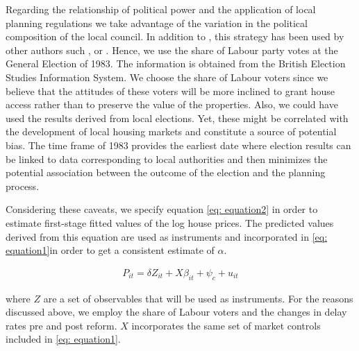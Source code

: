 \documentclass[12pt,letterpaper]{article}
\begin{document}
Regarding the relationship of political power and the application of local planning regulations we take
 advantage of the variation in the political composition of the local council. In addition to 
 \citet{hilber2016supply},
  this strategy has been used by other authors such \cite{bertrand2002does}, \cite{sadun2015} or \cite{cheshire2016}.
  Hence, we use the share of Labour party votes at the General Election of 1983.
   The information is obtained from the British Election Studies Information System.  
   We choose the share of Labour voters since we believe that the attitudes of these voters 
   will be more inclined to grant house access rather than to preserve the value of the properties.
    Also, we could have used the results derived from local elections. 
    Yet, these might be correlated with the development of local housing markets and constitute a source
     of potential bias. The time frame of 1983 provides the earliest date where election results can be linked
      to data corresponding to local authorities and then minimizes the potential association between the
       outcome of the election and the planning process.
         
Considering these caveats, we specify equation \ref{eq: equation2} in order to estimate first-stage fitted values of the log
 house prices. The predicted values derived from this equation are used as instruments and incorporated in
 \ref{eq: equation1}in order to get a consistent estimate of $\alpha$.
 
  \begin{eqnarray}
\label{eq equation2}
   P_{it} = \delta Z_{it} + X\beta_{it} +  \psi_{c} + u_{it}
 \end{eqnarray}

where $Z$ are a set of observables that will be used as instruments. 
For the reasons discussed above, we employ the share of Labour voters and the 
changes in delay rates pre and post reform.  $X$ incorporates the same set of market controls included in \ref{eq: equation1}.
\end{document}
